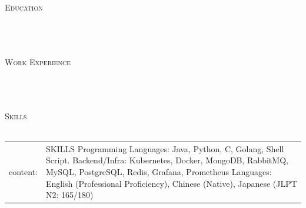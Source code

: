 \documentclass[a4paper]{article}
\newcommand{\lineunder} {
    \vspace*{-8pt} \\
    \hspace*{-18pt} \hrulefill \\
}
\newcommand{\header} [1] {
    {\hspace*{-18pt}\vspace*{6pt} \textsc{#1}}
    \vspace*{-6pt} \lineunder
}
\begin{document}
\vspace*{-40pt}


\vspace*{-10pt}
\begin{center}
  {\Huge \scshape {}}\\
        \
\end{center}


\header{Education}
 
\\
\hfill
\\
\vspace{2mm}



\header{Work Experience}
\vspace{1mm}
 
\\
 
\hfill
\\




\header{Skills}
\begin{tabular}{ l l }
	    content: & SKILLS\newline%
Programming Languages: Java, Python, C, Golang, Shell Script.\newline%
Backend/Infra: Kubernetes, Docker, MongoDB, RabbitMQ, MySQL, PostgreSQL, Redis, Grafana, Prometheus\newline%
Languages: English (Professional Proficiency), Chinese (Native), Japanese (JLPT N2: 165/180)\\
    \end{tabular}
\vspace{2mm}
\end{document}
